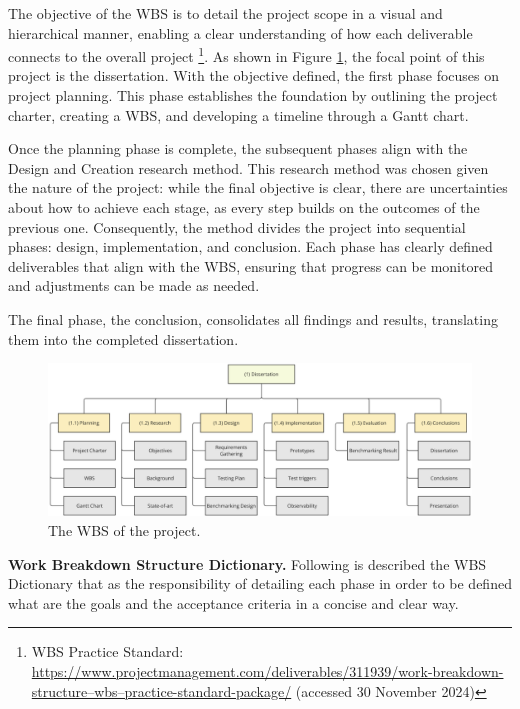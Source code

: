 The objective of the \gls{WBS} is to detail the project scope in a visual and hierarchical manner, enabling a clear understanding of how each deliverable connects to the overall project \footnote{WBS Practice Standard: \url{https://www.projectmanagement.com/deliverables/311939/work-breakdown-structure–wbs–practice-standard-package/} (accessed 30 November 2024)}. As shown in Figure \ref{fig:wbs}, the focal point of this project is the dissertation. With the objective defined, the first phase focuses on project planning. This phase establishes the foundation by outlining the project charter, creating a \gls{WBS}, and developing a timeline through a Gantt chart.

Once the planning phase is complete, the subsequent phases align with the Design and Creation research method. This research method was chosen given the nature of the project: while the final objective is clear, there are uncertainties about how to achieve each stage, as every step builds on the outcomes of the previous one. Consequently, the method divides the project into sequential phases: design, implementation, and conclusion. Each phase has clearly defined deliverables that align with the \gls{WBS}, ensuring that progress can be monitored and adjustments can be made as needed.

The final phase, the conclusion, consolidates all findings and results, translating them into the completed dissertation.


\begin{figure}
      \centering
      \includegraphics[width=\linewidth]{ch-planning/assets/wbs.png}
      \caption{The \gls{WBS} of the project.}
      \label{fig:wbs}
\end{figure}


\textbf{Work Breakdown Structure Dictionary.} Following is described the \gls{WBS} Dictionary that as the responsibility of detailing each phase in order to be defined what are the goals and the acceptance criteria in a concise and clear way.

